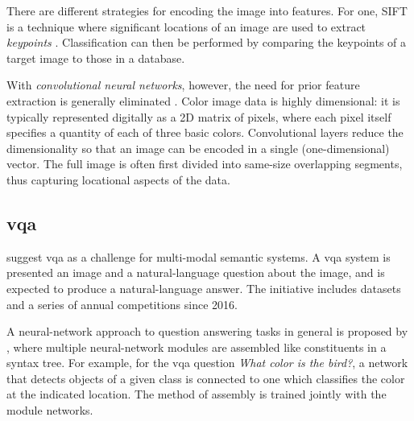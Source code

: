 There are different strategies for encoding the image into features.
For one, SIFT is a technique where significant locations of an image are used to extract \textit{keypoints} \citep{LoweObjectrecognitionlocal1999}.
Classification can then be performed by comparing the keypoints of a target image to those in a database.

With \textit{convolutional neural networks}, however, the need for prior feature extraction is generally eliminated \citep{HeDeepResidualLearning2015, HeMaskRCNN2017}.
Color image data is highly dimensional: it is typically represented digitally as a 2D matrix of pixels, where each pixel itself specifies a quantity of each of three basic colors.
Convolutional layers reduce the dimensionality so that an image can be encoded in a single (one-dimensional) vector.
The full image is often first divided into same-size overlapping segments, thus capturing locational aspects of the data.



\subsection{\Acrfull{vqa}}

\cite{AgrawalVQAVisualQuestion2015} suggest \gls{vqa} as a challenge for multi-modal semantic systems.
A \gls{vqa} system is presented an image and a natural-language question about the image, and is expected to produce a natural-language answer.
The initiative includes datasets and a series of annual competitions since 2016.

A neural-network approach to question answering tasks in general is proposed by \cite{AndreasLearningComposeNeural2016}, where multiple neural-network modules are assembled like constituents in a syntax tree.
For example, for the \gls{vqa} question \textit{What color is the bird?}, a network that detects objects of a given class is connected to one which classifies the color at the indicated location.
The method of assembly is trained jointly with the module networks.


